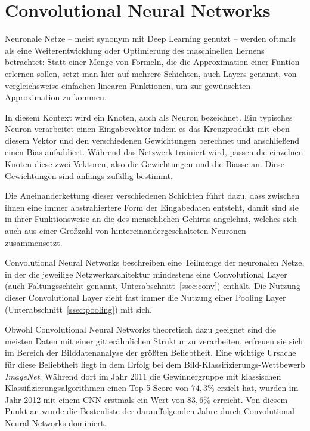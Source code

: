\section{Convolutional Neural Networks}
\label{sec:cnn}

Neuronale Netze -- meist synonym mit Deep Learning genutzt -- werden oftmals als eine Weiterentwicklung oder Optimierung des maschinellen Lernens betrachtet: Statt einer Menge von Formeln, die die Approximation einer Funtion erlernen sollen, setzt man hier auf mehrere Schichten, auch Layers genannt, von vergleichsweise einfachen linearen Funktionen, um zur gewünschten Approximation zu kommen. \cite{hardesty_17}

In diesem Kontext wird ein Knoten, auch als Neuron bezeichnet. Ein typisches Neuron verarbeitet einen Eingabevektor indem es das Kreuzprodukt mit eben diesem Vektor und den verschiedenen Gewichtungen berechnet und anschließend einen Bias aufaddiert. Während das Netzwerk trainiert wird, passen die einzelnen Knoten diese zwei Vektoren, also die Gewichtungen und die Biasse an. Diese Gewichtungen sind anfangs zufällig bestimmt. \cite{hardesty_17, cs231n}

Die Aneinanderkettung dieser verschiedenen Schichten führt dazu, dass zwischen ihnen eine immer abstrahiertere Form der Eingabedaten entsteht, damit sind sie in ihrer Funktionsweise an die des menschlichen Gehirns angelehnt, welches sich auch aus einer Großzahl von hintereinandergeschalteten Neuronen zusammensetzt. %

Convolutional Neural Networks beschreiben eine Teilmenge der neuronalen Netze, in der die jeweilige Netzwerkarchitektur mindestens eine Convolutional Layer (auch Faltungsschicht genannt, \vgl Unterabschnitt~\ref{ssec:conv}) enthält. Die Nutzung dieser Convolutional Layer zieht fast immer die Nutzung einer Pooling Layer (Unterabschnitt~\ref{ssec:pooling}) mit sich. \cite{deeplearning_16}

Obwohl Convolutional Neural Networks theoretisch dazu geeignet sind die meisten Daten mit einer gitterähnlichen Struktur zu verarbeiten, erfreuen sie sich im Bereich der Bilddatenanalyse der größten Beliebtheit. \cite[Kap.~9]{deeplearning_16} Eine wichtige Ursache für diese Beliebtheit liegt \bspw in dem Erfolg bei dem Bild-Klassifizierungs-Wettbewerb \textit{ImageNet}. Während dort im Jahr 2011 die Gewinnergruppe mit klassischen Klassifizierungsalgorithmen einen Top-5-Score von $74,3\%$ erzielt hat, wurden im Jahr 2012 mit einem CNN erstmals ein Wert von $83,6\%$ erreicht. Von diesem Punkt an wurde die Bestenliste der darauffolgenden Jahre durch Convolutional Neural Networks dominiert. \cite[Kap.~1]{deeplearning_18}

